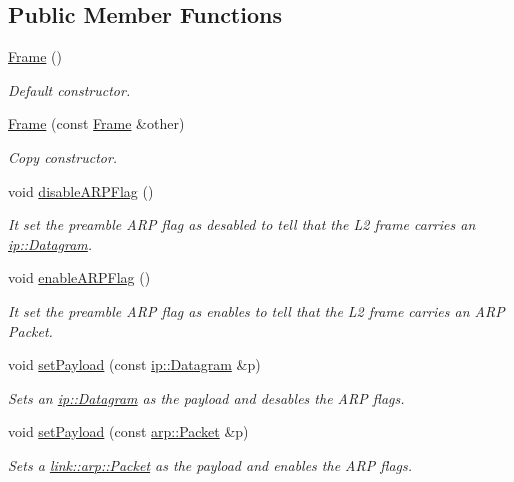 \subsection*{Public Member Functions}
\begin{DoxyCompactItemize}
\item 
\hyperlink{structlink_1_1Frame_a66cdf70363bbb87ff48c661fdeb63242}{Frame} ()
\begin{DoxyCompactList}\small\item\em Default constructor. \end{DoxyCompactList}\item 
\hyperlink{structlink_1_1Frame_aea0b6d8d213840254aac152351a7c46a}{Frame} (const \hyperlink{structlink_1_1Frame}{Frame} \&other)
\begin{DoxyCompactList}\small\item\em Copy constructor. \end{DoxyCompactList}\item 
void \hyperlink{structlink_1_1Frame_a7dfe0d1f9213795013c55120438b9790}{disable\+A\+R\+P\+Flag} ()\hypertarget{structlink_1_1Frame_a7dfe0d1f9213795013c55120438b9790}{}\label{structlink_1_1Frame_a7dfe0d1f9213795013c55120438b9790}

\begin{DoxyCompactList}\small\item\em It set the preamble A\+RP flag as desabled to tell that the L2 frame carries an \hyperlink{structip_1_1Datagram}{ip\+::\+Datagram}. \end{DoxyCompactList}\item 
void \hyperlink{structlink_1_1Frame_aa27284375795ced3f503efcd617fb65e}{enable\+A\+R\+P\+Flag} ()
\begin{DoxyCompactList}\small\item\em It set the preamble A\+RP flag as enables to tell that the L2 frame carries an A\+RP Packet. \end{DoxyCompactList}\item 
void \hyperlink{structlink_1_1Frame_af14b9acc0bd67497f8d008425c36462e}{set\+Payload} (const \hyperlink{structip_1_1Datagram}{ip\+::\+Datagram} \&p)\hypertarget{structlink_1_1Frame_af14b9acc0bd67497f8d008425c36462e}{}\label{structlink_1_1Frame_af14b9acc0bd67497f8d008425c36462e}

\begin{DoxyCompactList}\small\item\em Sets an \hyperlink{structip_1_1Datagram}{ip\+::\+Datagram} as the payload and desables the A\+RP flags. \end{DoxyCompactList}\item 
void \hyperlink{structlink_1_1Frame_a9eb67e1eb8d928dba0a42451edb590eb}{set\+Payload} (const \hyperlink{structlink_1_1arp_1_1Packet}{arp\+::\+Packet} \&p)\hypertarget{structlink_1_1Frame_a9eb67e1eb8d928dba0a42451edb590eb}{}\label{structlink_1_1Frame_a9eb67e1eb8d928dba0a42451edb590eb}

\begin{DoxyCompactList}\small\item\em Sets a \hyperlink{structlink_1_1arp_1_1Packet}{link\+::arp\+::\+Packet} as the payload and enables the A\+RP flags. \end{DoxyCompactList}\end{DoxyCompactItemize}
